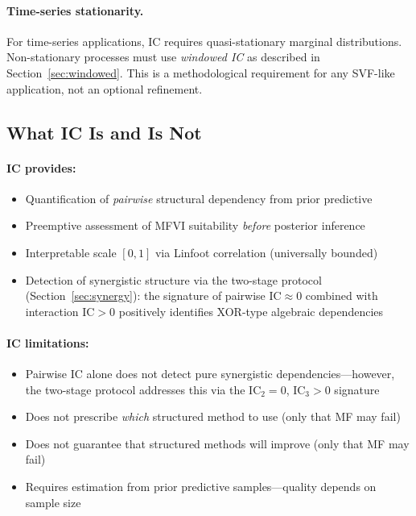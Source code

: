 \documentclass[10pt]{article} %
\theoremstyle{plain}
\theoremstyle{definition}
\newcommand{\IC}{\mathrm{IC}}  %
\begin{document}
\paragraph{Time-series stationarity.} For time-series applications, IC requires quasi-stationary marginal distributions. Non-stationary processes must use \emph{windowed IC} as described in Section~\ref{sec:windowed}. This is a methodological requirement for any SVF-like application, not an optional refinement.

\subsection{What IC Is and Is Not}
\label{sec:what_cf_is}

\paragraph{IC provides:}
\begin{itemize}
    \item Quantification of \emph{pairwise} structural dependency from prior predictive
    \item Preemptive assessment of MFVI suitability \emph{before} posterior inference
    \item Interpretable scale $[0,1]$ via Linfoot correlation (universally bounded)
    \item Detection of synergistic structure via the two-stage protocol (Section~\ref{sec:synergy}): the signature of pairwise $\IC \approx 0$ combined with interaction $\IC > 0$ positively identifies XOR-type algebraic dependencies
\end{itemize}

\paragraph{IC limitations:}
\begin{itemize}
    \item Pairwise IC alone does not detect pure synergistic dependencies---however, the two-stage protocol addresses this via the $\IC_2 = 0$, $\IC_3 > 0$ signature
    \item Does not prescribe \emph{which} structured method to use (only that MF may fail)
    \item Does not guarantee that structured methods will improve (only that MF may fail)
    \item Requires estimation from prior predictive samples---quality depends on sample size
\end{itemize}
\end{document}
